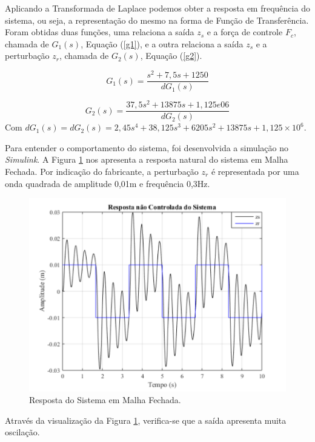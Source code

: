 \documentclass[journal,brazil,english]{IEEEtran}
\begin{document}
Aplicando a Transformada de Laplace podemos obter a resposta em frequência do sistema, ou seja, a representação do mesmo na forma de Função de Transferência. Foram obtidas duas funções, uma relaciona a saída $z_s$ e a força de controle $F_c$, chamada de $G_1(s)$, Equação (\ref{g1}), e a outra relaciona a saída $z_s$ e a perturbação $z_r$, chamada de $G_2(s)$, Equação (\ref{g2}).

\begin{equation}\label{g1}
G_1(s) = \frac{s^2+7,5s+1250}{dG_1(s)}
\end{equation}

\begin{equation}\label{g2}
G_2(s) = \frac{37,5s^2+13875s+1,125e06}{dG_2(s)} 
\end{equation}
Com $dG_1(s)=dG_2(s)=2,45s^4+38,125s^3+6205s^2+13875s+1,125\times10^6$.

Para entender o comportamento do sistema, foi desenvolvida a simulação no \textit{Simulink}. A Figura \ref{mfechada} nos apresenta a resposta natural do sistema em Malha Fechada. Por indicação do fabricante, a perturbação $z_r$ é representada por uma onda quadrada de amplitude 0,01m e frequência 0,3Hz.

\begin{figure}[H]
	\centering
\includegraphics[width=\columnwidth]{./imagens/sistema_malha_fechada.pdf}
	\renewcommand{\figurename}{Fig.}
    \caption{Resposta do Sistema em Malha Fechada.}
	\label{mfechada}
\end{figure}

Através da visualização da Figura \ref{mfechada}, verifica-se que a saída apresenta muita oscilação.
\end{document}
